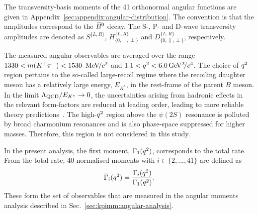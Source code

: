 The transversity-basis moments of the 41 orthonormal angular functions are given in Appendix~\ref{sec:appendix:angular-distribution}. The convention is that the amplitudes correspond to the $\Bzb$ decay. The S-, P- and D-wave transversity amplitudes are denoted as $S^{\{L,R\}}$, $H^{\{L,R\}}_{\{0,\parallel,\perp\}}$ and $D^{\{L,R\}}_{\{0,\parallel,\perp\}}$, respectively. 

The measured angular observables are averaged over the range $1330<\mkpi<1530~\mevcc$ and $1.1<\qsq<6.0\gevgevcccc$. The choice of $\qsq$ region pertains to the so-called large-recoil regime where the recoiling daughter meson has a relatively large energy, $E_{K^\ast}$, in the rest-frame of the parent $B$ meson. In the limit $\Lambda_{\rm QCD}/E_{K^\ast} \to 0$, the uncertainties arising from hadronic effects in the relevant form-factors are reduced at leading order, leading to more reliable theory predictions~\cite{DescotesGenon:2013wba}. The high-$\qsq$ region above the $\psi(2S)$ resonance is polluted by broad charmonium resonances and is also phase-space suppressed for higher \mkpi masses. Therefore, this region is not considered in this study.

In the present analysis, the first moment, $\Gamma_{1}(\qsq)$, corresponds to the total rate. From the total rate, 40 normalised moments with $i \in \{2,...,41\}$ are defined as
\begin{equation}
\label{eqn:norm_mom_def}
\overline{\Gamma}_i(\qsq) = \frac{\Gamma_{i}(\qsq)}{\Gamma_{1}(\qsq)}.
\end{equation}
\noindent These form the set of observables that are measured in the angular moments analysis described in Sec.~\ref{sec:kpimm:angular-analysis}.


